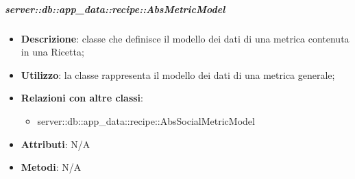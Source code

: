 		\subparagraph{server::db::app\_data::recipe::AbsMetricModel} %
		\label{subp:server_db_app_data_recipe_absmetricmodel}
			\begin{itemize}
				\item \textbf{Descrizione}: classe che definisce il modello dei dati di una metrica contenuta in una Ricetta;
				\item \textbf{Utilizzo}: la classe rappresenta il modello dei dati di una metrica generale;
				\item \textbf{Relazioni con altre classi}:
					\begin{itemize}
						\item server::db::app\_data::recipe::AbsSocialMetricModel
					\end{itemize}
				\item \textbf{Attributi}: N/A
				\item \textbf{Metodi}: N/A
			\end{itemize}


